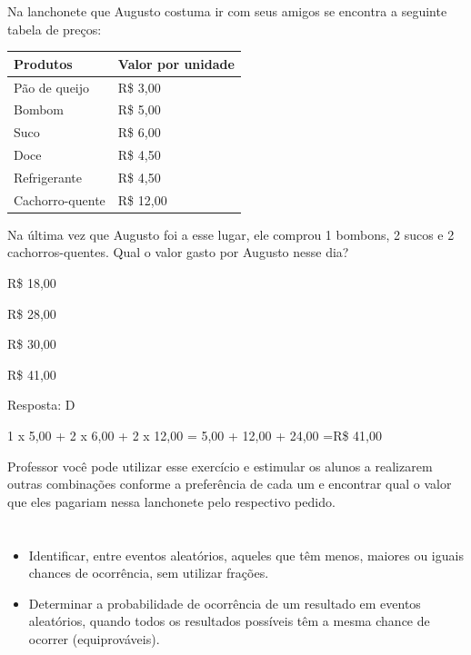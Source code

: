 \begin{escolha}
Na lanchonete que Augusto costuma ir com seus amigos se encontra a
seguinte tabela de preços:

\begin{longtable}[]{@{}ll@{}}
\toprule
Produtos & Valor por unidade\tabularnewline
\midrule
\endhead
Pão de queijo & R\$ 3,00\tabularnewline
Bombom & R\$ 5,00\tabularnewline
Suco & R\$ 6,00\tabularnewline
Doce & R\$ 4,50\tabularnewline
Refrigerante & R\$ 4,50\tabularnewline
Cachorro-quente & R\$ 12,00\tabularnewline
\bottomrule
\end{longtable}

Na última vez que Augusto foi a esse lugar, ele comprou 1 bombons, 2
sucos e 2 cachorros-quentes. Qual o valor gasto por Augusto nesse dia?

\begin{escolha}

\item
  R\$ 18,00
\item
  R\$ 28,00
\item
  R\$ 30,00
\item
  R\$ 41,00
\end{escolha}

Resposta: D

1 x 5,00 + 2 x 6,00 + 2 x 12,00 = 5,00 + 12,00 + 24,00 =R\$ 41,00

Professor você pode utilizar esse exercício e estimular os alunos a
realizarem outras combinações conforme a preferência de cada um e
encontrar qual o valor que eles pagariam nessa lanchonete pelo
respectivo pedido.

\chapter{}



\begin{itemize}
    \item Identificar, entre eventos aleatórios, aqueles que têm menos, maiores ou
iguais chances de ocorrência, sem utilizar frações.

    \item Determinar a probabilidade de ocorrência de um resultado em eventos
aleatórios, quando todos os resultados possíveis têm a mesma chance de
ocorrer (equiprováveis).
\end{itemize}

\conteudo{

}
\end{escolha}
